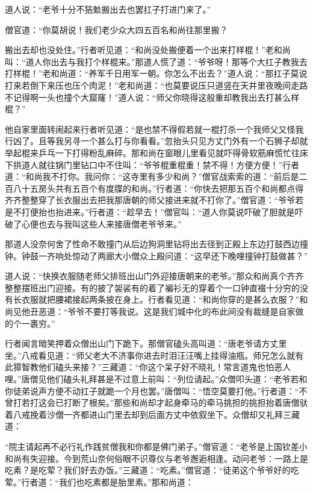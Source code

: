 \documentclass[12pt,UTF8]{ctexbook}
\begin{document}
{道人说：“老爷十分不狤魀搬出去也罢扛子打进门来了。”

僧官道：“你莫胡说！我们老少众大四五百名和尚往那里搬？

搬出去却也没处住。”行者听见道：“和尚没处搬便着一个出来打样棍！”老和尚叫：“道人你出去与我打个样棍来。”那道人慌了道：“爷爷呀！那等个大扛子教我去打样棍！”老和尚道：“养军千日用军一朝。你怎么不出去？”道人说：“那扛子莫说打来若倒下来压也压个肉泥！”老和尚道：“也莫要说压只道竖在天井里夜晚间走路不记得啊一头也撞个大窟窿！”道人说：“师父你晓得这般重却教我出去打甚么样棍？”

他自家里面转闹起来行者听见道：“是也禁不得假若就一棍打杀一个我师父又怪我行凶了。且等我另寻一个甚么打与你看看。”忽抬头只见方丈门外有一个石狮子却就举起棍来乒乓一下打得粉乱麻碎。那和尚在窗眼儿里看见就吓得骨软筋麻慌忙往床下拱道人就往锅门里钻口中不住叫：“爷爷棍重棍重！禁不得！方便方便！”行者道：“和尚我不打你。我问你：“这寺里有多少和尚？”僧官战索索的道：“前后是二百八十五房头共有五百个有度牒的和尚。”行者道：“你快去把那五百个和尚都点得齐齐整整穿了长衣服出去把我那唐朝的师父接进来就不打你了。”僧官道：“爷爷若是不打便抬也抬进来。”行者道：“趁早去！”僧官叫：“道人你莫说吓破了胆就是吓破了心便也去与我叫这些人来接唐僧老爷爷来。”

那道人没奈何舍了性命不敢撞门从后边狗洞里钻将出去径到正殿上东边打鼓西边撞钟。钟鼓一齐响处惊动了两廊大小僧众上殿问道：“这早还下晚哩撞钟打鼓做甚？”

道人说：“快换衣服随老师父排班出山门外迎接唐朝来的老爷。”那众和尚真个齐齐整整摆班出门迎接。有的披了袈裟有的着了褊衫无的穿着个一口钟直裰十分穷的没有长衣服就把腰裙接起两条披在身上。行者看见道：“和尚你穿的是甚么衣服？”和尚见他丑恶道：“爷爷不要打等我说。这是我们城中化的布此间没有裁缝是自家做的个一裹穷。”

行者闻言暗笑押着众僧出山门下跪下。那僧官磕头高叫道：“唐老爷请方丈里坐。”八戒看见道：“师父老大不济事你进去时泪汪汪嘴上挂得油瓶。师兄怎么就有此獐智教他们磕头来接？”三藏道：“你这个呆子好不晓礼！常言道鬼也怕恶人哩。”唐僧见他们磕头礼拜甚是不过意上前叫：“列位请起。”众僧叩头道：“老爷若和你徒弟说声方便不动扛子就跪一个月也罢。”唐僧叫：“悟空莫要打他。”行者道：“不曾打若打这会已打断了根矣。”那些和尚却才起身牵马的牵马挑担的挑担抬着唐僧驮着八戒挽着沙僧一齐都进山门里去却到后面方丈中依叙坐下。众僧却又礼拜三藏道：

“院主请起再不必行礼作践贫僧我和你都是佛门弟子。”僧官道：“老爷是上国钦差小和尚有失迎接。今到荒山奈何俗眼不识尊仪与老爷邂逅相逢。动问老爷：一路上是吃素？是吃荤？我们好去办饭。”三藏道：“吃素。”僧官道：“徒弟这个爷爷好的吃荤。”行者道：“我们也吃素都是胎里素。”那和尚道：

}
\end{document}
